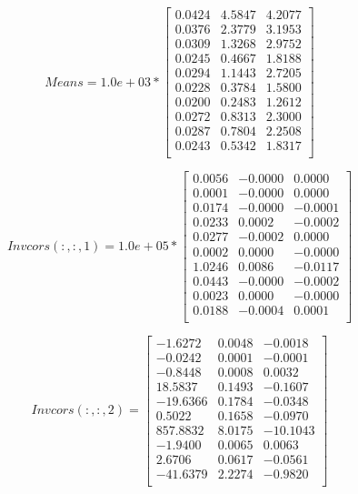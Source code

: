\documentclass[11pt]{article}
\begin{document}
		\[
Means =
1.0e+03 *
  \begin{bmatrix}
    0.0424 &   4.5847 &   4.2077\\
    0.0376  &  2.3779  &  3.1953\\
    0.0309  &  1.3268   & 2.9752\\
    0.0245  &  0.4667   & 1.8188\\
    0.0294  &  1.1443    &2.7205\\
    0.0228  &  0.3784 &   1.5800\\
    0.0200  &  0.2483  &  1.2612\\
    0.0272  &  0.8313   & 2.3000\\
    0.0287   & 0.7804  &  2.2508\\
    0.0243  &  0.5342  &  1.8317\\
  \end{bmatrix}
\]


		\[
Invcors(:,:,1) = 
1.0e+05 *
	\begin{bmatrix}
	0.0056 &  -0.0000  &  0.0000\\
    0.0001  & -0.0000  &  0.0000\\
    0.0174 &  -0.0000  & -0.0001\\
    0.0233  &  0.0002  & -0.0002\\
    0.0277  & -0.0002  &  0.0000\\
    0.0002  &  0.0000  & -0.0000\\
    1.0246  &  0.0086  & -0.0117\\
    0.0443  & -0.0000  & -0.0002\\
    0.0023  &  0.0000  & -0.0000\\
    0.0188  & -0.0004 &   0.0001\\	
	\end{bmatrix}
\]


\[
Invcors(:,:,2) = 
	\begin{bmatrix}
   -1.6272 &   0.0048  & -0.0018\\
   -0.0242  &  0.0001  & -0.0001\\
   -0.8448  &  0.0008  &  0.0032\\
   18.5837  &  0.1493  & -0.1607\\
  -19.6366  &  0.1784  & -0.0348\\
    0.5022  &  0.1658 &  -0.0970\\
  857.8832  &  8.0175 & -10.1043\\
   -1.9400  &  0.0065 &   0.0063\\
    2.6706  &  0.0617 &  -0.0561\\
  -41.6379  &  2.2274 &  -0.9820\\
	\end{bmatrix}	
\]
	
\end{document}
